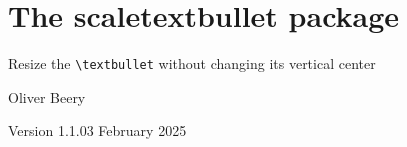 \documentclass{article}
\begin{document}
\section*{\Large The \textsf{scaletextbullet} package}

Resize the \texttt{\textbackslash{}textbullet} without changing its vertical center

Oliver Beery

Version 1.1.0\quad{}3 February 2025

%
\end{document}
